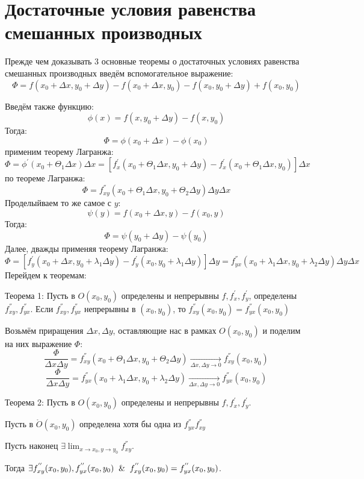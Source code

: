 \section{Достаточные условия равенства смешанных производных}
Прежде чем доказывать 3 основные теоремы о достаточных условиях равенства смешанных производных введём вспомогательное  выражение: 
$$\Phi = f(x_0 + \Delta x, y_0 + \Delta y) - f(x_0 + \Delta x, y_0) - f(x_0, y_0 + \Delta y) + f(x_0, y_0)$$

Введём также функцию:
$$
\phi (x) = f(x, y_0 + \Delta y) -  f(x, y_0)
$$
Тогда:
$$\Phi = \phi (x_0 + \Delta x) - \phi (x_0)$$
применим теорему Лагранжа:
$$
\Phi = \phi^{'}(x_0 + \Theta_1\Delta x)\Delta x = [f_x^{'}(x_0 + \Theta_1\Delta x, y_0 + \Delta y) - f_x^{'}(x_0 + \Theta_1\Delta x, y_0)]\Delta x
$$  
по теореме Лагранжа:
$$
\Phi = f_{x y}^{''}(x_0 + \Theta_1\Delta x, y_0 + \Theta_2\Delta y)\Delta y \Delta x
$$
Проделыйваем то же самое с $y$: 
$$
\psi (y) = f(x_0 + \Delta x, y) -  f(x_0, y)
$$ 
Тогда:
$$
\Phi = \psi (y_0 + \Delta y) - \psi (y_0)
$$
Далее, дважды применяя теорему Лагранжа:
$$
\Phi = [f_y^{'}(x_0 + \Delta x, y_0 + \lambda_1\Delta y) - f_y^{'}(x_0, y_0+\lambda_1\Delta y)]\Delta y = f_{y x}^{''}(x_0 + \lambda_1\Delta x, y_0 + \lambda_2\Delta y)\Delta y \Delta x
$$
Перейдем к теоремам:
 
Теорема 1: Пусть в $O(x_0, y_0)$ определены и непрерывны $f, f_{x}^{'}, f_{y}^{'}$, определены $f_{x y}^{''}, f_{y x}^{''}$. Если $f_{x y}^{''}, f_{y x}^{''}$ непрерывны в $(x_0, y_0)$, то $f_{x y}^{''}(x_0, y_0) = f_{y x}^{''}(x_0, y_0)$
 
Возьмём приращения $\Delta x, \Delta y$, оставляющие нас в рамках $O(x_0, y_0)$ и поделим на них выражение $\Phi$:
$$
\frac{\Phi}{\Delta x \Delta y} = f_{x y}^{''}(x_0 + \Theta_1\Delta x, y_0 + \Theta_2\Delta y) \underset{\Delta x, \Delta y \to 0}{\longrightarrow} f_{x y}^{''}(x_0, y_0)
$$
$$
\frac{\Phi}{\Delta x \Delta y} = f_{y x}^{''}(x_0 + \lambda_1\Delta x, y_0 + \lambda_2\Delta y) \underset{\Delta x, \Delta y \to 0}{\longrightarrow} f_{y x}^{''}(x_0, y_0)
$$

Теорема 2:  Пусть в $O(x_0, y_0)$ определены и непрерывны $f, f_{x}^{'}, f_{y}^{'}$.

Пусть в $\mathring O(x_0, y_0)$ определена хотя бы одна из $f_{y x}^{''}  f_{x y}^{''} $

Пусть наконец $\exists \lim_{x \to x_0, y \to y_0}{f_{x y}^{''}}$. 

Тогда 
$\exists f_{x y}^{''}(x_0, y_0), f_{y x}^{''}(x_0, y_0) \And f_{x y}^{''}(x_0, y_0) = f_{y x}^{''}(x_0, y_0)$.

